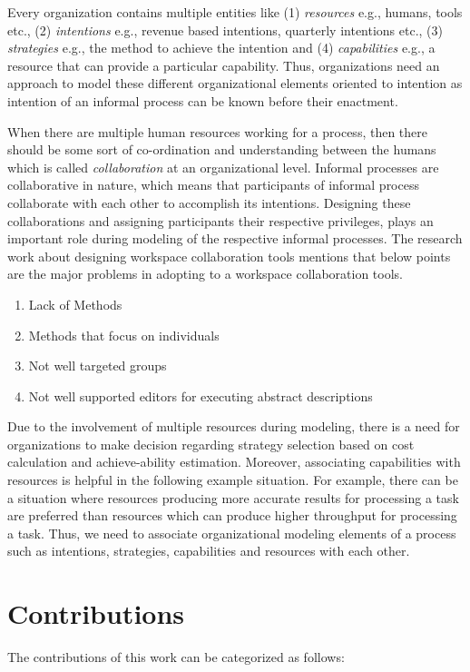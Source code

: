 Every organization contains multiple entities like (1) \textit{resources} e.g., humans, tools etc., (2) \textit{intentions} e.g., revenue based intentions, quarterly intentions etc., (3) \textit{strategies} e.g., the method to achieve the intention and (4) \textit{capabilities} e.g., a resource that can provide a particular capability. Thus, organizations need an approach to model these different organizational elements oriented to intention as intention of an informal process can be known before their enactment.

When there are multiple human resources working for a process, then there should be some sort of co-ordination and understanding between the humans which is called \textit{collaboration} at an organizational level. Informal processes are collaborative in nature, which means that participants of informal process collaborate with each other to accomplish its intentions\cite{Sungur2015}. Designing these collaborations and assigning participants their respective privileges, plays an important role during modeling of the respective informal processes. The research work about designing workspace collaboration tools \cite{Matthews2011} mentions that below points are the major problems in adopting to a workspace collaboration tools.

\begin{enumerate}
	\item Lack of Methods
	\item Methods that focus on individuals
	\item Not well targeted groups
	\item Not well supported editors for executing abstract descriptions
\end{enumerate}

Due to the involvement of multiple resources during modeling, there is a need for organizations to make decision regarding strategy selection based on cost calculation and achieve-ability estimation.  Moreover, associating capabilities with resources is helpful in the following example situation. For example, there can be a situation where resources producing more accurate results for processing a task are preferred than resources which can produce higher throughput for processing a task. Thus, we need to associate organizational modeling elements of a process such as intentions, strategies, capabilities and resources with each other. 

\section {Contributions}
\label{sec:researchobjectives}
The contributions of this work can be categorized as follows:

